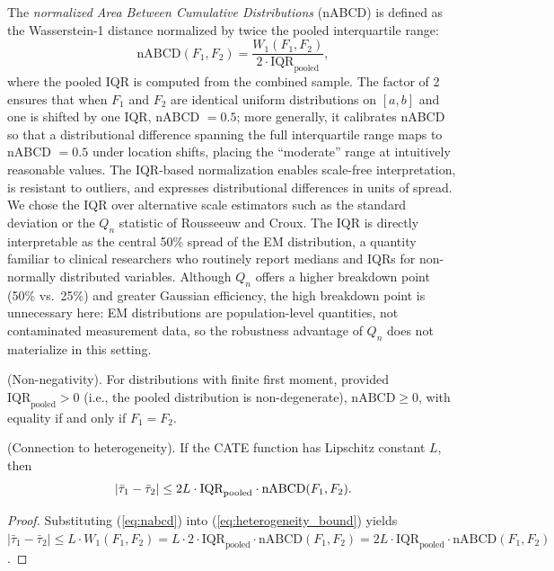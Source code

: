 \documentclass[AMA,Times1COL]{WileyNJDv5}
\begin{document}
The \emph{normalized Area Between Cumulative Distributions} (nABCD) is defined as the Wasserstein-1 distance normalized by twice the pooled interquartile range:
\begin{equation}
\text{nABCD}(F_1, F_2) = \frac{W_1(F_1, F_2)}{2 \cdot \text{IQR}_{\text{pooled}}},
\label{eq:nabcd}
\end{equation}
where the pooled IQR is computed from the combined sample. The factor of 2 ensures that when $F_1$ and $F_2$ are identical uniform distributions on $[a, b]$ and one is shifted by one IQR, nABCD $= 0.5$; more generally, it calibrates nABCD so that a distributional difference spanning the full interquartile range maps to nABCD $= 0.5$ under location shifts, placing the ``moderate'' range at intuitively reasonable values. The IQR-based normalization enables scale-free interpretation, is resistant to outliers, and expresses distributional differences in units of spread.
We chose the IQR over alternative scale estimators such as the standard deviation or the $Q_n$ statistic of Rousseeuw and Croux.\cite{rousseeuw1993} The IQR is directly interpretable as the central 50\% spread of the EM distribution, a quantity familiar to clinical researchers who routinely report medians and IQRs for non-normally distributed variables. Although $Q_n$ offers a higher breakdown point (50\% vs.\ 25\%) and greater Gaussian efficiency, the high breakdown point is unnecessary here: EM distributions are population-level quantities, not contaminated measurement data, so the robustness advantage of $Q_n$ does not materialize in this setting.

\begin{proposition}\label{prop:boundedness}
\textup{(Non-negativity).} For distributions with finite first moment, provided $\mathrm{IQR}_{\mathrm{pooled}} > 0$ (i.e., the pooled distribution is non-degenerate), $\text{nABCD} \geq 0$, with equality if and only if $F_1 = F_2$.
\end{proposition}

\begin{proposition}\label{prop:heterogeneity}
\textup{(Connection to heterogeneity).} If the CATE function has Lipschitz constant $L$, then
\begin{equation}
|\bar{\tau}_1 - \bar{\tau}_2| \leq 2L \cdot \text{IQR}_{\textup{pooled}} \cdot \text{nABCD}(F_1, F_2).
\label{eq:heterogeneity_nabcd}
\end{equation}
\end{proposition}

\begin{proof}
Substituting (\ref{eq:nabcd}) into (\ref{eq:heterogeneity_bound}) yields $|\bar{\tau}_1 - \bar{\tau}_2| \leq L \cdot W_1(F_1, F_2) = L \cdot 2 \cdot \text{IQR}_{\text{pooled}} \cdot \text{nABCD}(F_1, F_2) = 2L \cdot \text{IQR}_{\text{pooled}} \cdot \text{nABCD}(F_1, F_2)$.
\end{proof}
\end{document}

